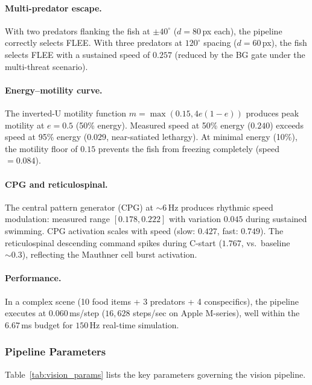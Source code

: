 \documentclass[11pt,a4paper]{article}
\begin{document}
\paragraph{Multi-predator escape.}
With two predators flanking the fish at $\pm40^\circ$ ($d = 80$\,px each),
the pipeline correctly selects FLEE. With three predators at $120^\circ$
spacing ($d = 60$\,px), the fish selects FLEE with a sustained speed
of $0.257$ (reduced by the BG gate under the multi-threat scenario).

\paragraph{Energy--motility curve.}
The inverted-U motility function $m = \max(0.15, 4e(1-e))$ produces
peak motility at $e = 0.5$ (50\% energy). Measured speed at 50\% energy
($0.240$) exceeds speed at 95\% energy ($0.029$, near-satiated lethargy).
At minimal energy (10\%), the motility floor of $0.15$ prevents the fish
from freezing completely (speed\,$= 0.084$).

\paragraph{CPG and reticulospinal.}
The central pattern generator (CPG) at $\sim\!6$\,Hz produces rhythmic
speed modulation: measured range $[0.178, 0.222]$ with variation $0.045$
during sustained swimming. CPG activation scales with speed
(slow: $0.427$, fast: $0.749$). The reticulospinal descending command
spikes during C-start ($1.767$, vs.\ baseline $\sim\!0.3$), reflecting
the Mauthner cell burst activation.

\paragraph{Performance.}
In a complex scene (10 food items + 3 predators + 4 conspecifics),
the pipeline executes at 0.060\,ms/step ($16{,}628$ steps/sec on Apple M-series),
well within the $6.67$\,ms budget for $150$\,Hz real-time simulation.

\subsubsection{Pipeline Parameters}

Table~\ref{tab:vision_params} lists the key parameters governing the vision pipeline.
\end{document}
